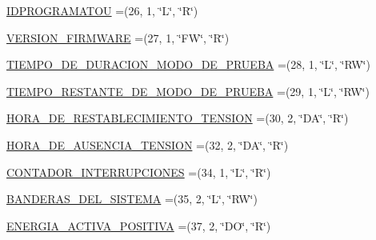 \begin{DoxyCompactItemize}
\item 
\hyperlink{enumcom_1_1eneri_1_1scorpio__metertool_1_1devices_1_1_register_a352fc14d891208ac68959a706377ba0d}{I\+D\+P\+R\+O\+G\+R\+A\+M\+A\+T\+OU} =(26, 1, \char`\"{}L\char`\"{}, \char`\"{}R\char`\"{})
\item 
\hyperlink{enumcom_1_1eneri_1_1scorpio__metertool_1_1devices_1_1_register_a13dc9d37d24be84cca8915830c91c3f2}{V\+E\+R\+S\+I\+O\+N\+\_\+\+F\+I\+R\+M\+W\+A\+RE} =(27, 1, \char`\"{}FW\char`\"{}, \char`\"{}R\char`\"{})
\item 
\hyperlink{enumcom_1_1eneri_1_1scorpio__metertool_1_1devices_1_1_register_a3d673cdeed71c4dde851e398bc724956}{T\+I\+E\+M\+P\+O\+\_\+\+D\+E\+\_\+\+D\+U\+R\+A\+C\+I\+O\+N\+\_\+\+M\+O\+D\+O\+\_\+\+D\+E\+\_\+\+P\+R\+U\+E\+BA} =(28, 1, \char`\"{}L\char`\"{}, \char`\"{}RW\char`\"{})
\item 
\hyperlink{enumcom_1_1eneri_1_1scorpio__metertool_1_1devices_1_1_register_a5ef4e096655409887c67a3ad419826fd}{T\+I\+E\+M\+P\+O\+\_\+\+R\+E\+S\+T\+A\+N\+T\+E\+\_\+\+D\+E\+\_\+\+M\+O\+D\+O\+\_\+\+D\+E\+\_\+\+P\+R\+U\+E\+BA} =(29, 1, \char`\"{}L\char`\"{}, \char`\"{}RW\char`\"{})
\item 
\hyperlink{enumcom_1_1eneri_1_1scorpio__metertool_1_1devices_1_1_register_aaababfdfc61f66e1e7ff96ef6088d742}{H\+O\+R\+A\+\_\+\+D\+E\+\_\+\+R\+E\+S\+T\+A\+B\+L\+E\+C\+I\+M\+I\+E\+N\+T\+O\+\_\+\+T\+E\+N\+S\+I\+ON} =(30, 2, \char`\"{}DA\char`\"{}, \char`\"{}R\char`\"{})
\item 
\hyperlink{enumcom_1_1eneri_1_1scorpio__metertool_1_1devices_1_1_register_a8b5a714477404c2ab1bdea3bfb4f356f}{H\+O\+R\+A\+\_\+\+D\+E\+\_\+\+A\+U\+S\+E\+N\+C\+I\+A\+\_\+\+T\+E\+N\+S\+I\+ON} =(32, 2, \char`\"{}DA\char`\"{}, \char`\"{}R\char`\"{})
\item 
\hyperlink{enumcom_1_1eneri_1_1scorpio__metertool_1_1devices_1_1_register_ae1b8f46760dc43a91d337ef393dadb89}{C\+O\+N\+T\+A\+D\+O\+R\+\_\+\+I\+N\+T\+E\+R\+R\+U\+P\+C\+I\+O\+N\+ES} =(34, 1, \char`\"{}L\char`\"{}, \char`\"{}R\char`\"{})
\item 
\hyperlink{enumcom_1_1eneri_1_1scorpio__metertool_1_1devices_1_1_register_a478197c3463813e1f62ee553827cf246}{B\+A\+N\+D\+E\+R\+A\+S\+\_\+\+D\+E\+L\+\_\+\+S\+I\+S\+T\+E\+MA} =(35, 2, \char`\"{}L\char`\"{}, \char`\"{}RW\char`\"{})
\item 
\hyperlink{enumcom_1_1eneri_1_1scorpio__metertool_1_1devices_1_1_register_a9068be587e03054d012024b6e1c71039}{E\+N\+E\+R\+G\+I\+A\+\_\+\+A\+C\+T\+I\+V\+A\+\_\+\+P\+O\+S\+I\+T\+I\+VA} =(37, 2, \char`\"{}DO\char`\"{}, \char`\"{}R\char`\"{})

\end{DoxyCompactItemize}
